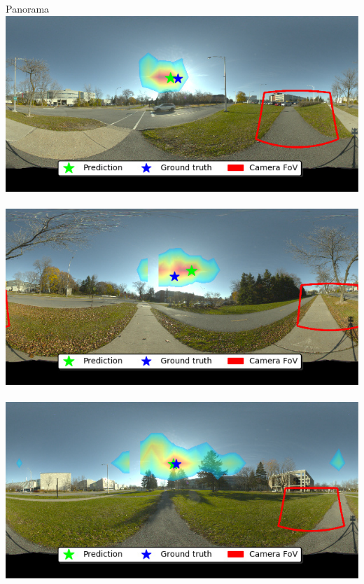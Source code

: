\begin{minipage}{\linewidth}
\begin{multicols}{4}
\vfill\null
\columnbreak

Panorama\\


\includegraphics[width=\mywidth]{AG8A2749_Panorama_hdr-corrected.jpg}\\
\vspace{\panoheight}\\
\includegraphics[width=\mywidth]{AG8A2791_Panorama_hdr-corrected_004.jpg}\\
\vspace{\panoheight}\\
\includegraphics[width=\mywidth]{AG8A2833_Panorama_hdr-corrected.jpg}\\

\end{multicols}
\end{minipage}

